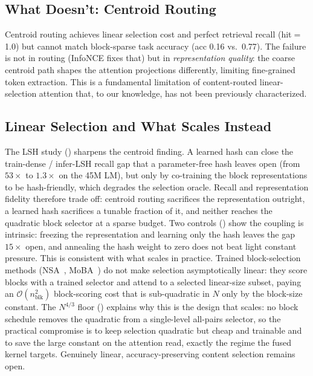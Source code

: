 \documentclass[10pt,letterpaper]{article}
\newcommand{\Ocomplex}{\mathcal{O}}
\begin{document}
\subsection{What Doesn't: Centroid Routing}

Centroid routing achieves linear selection cost and perfect retrieval recall
(hit$=$1.0) but cannot match block-sparse task accuracy (acc 0.16 vs.\ 0.77).
The failure is not in routing (InfoNCE \cite{oord2018infonce} fixes that) but
in \emph{representation quality}: the coarse centroid path shapes the
attention projections differently, limiting fine-grained token extraction.
This is a fundamental limitation of content-routed linear-selection attention
that, to our knowledge, has not been previously characterized.

\subsection{Linear Selection and What Scales Instead}

The LSH study () sharpens the centroid finding. A learned hash can
close the train-dense / infer-LSH recall gap that a parameter-free hash leaves
open (from $53\times$ to $1.3\times$ on the 45M LM), but only by co-training the
block representations to be hash-friendly, which degrades the selection oracle.
Recall and representation fidelity therefore trade off: centroid routing
sacrifices the representation outright, a learned hash sacrifices a tunable
fraction of it, and neither reaches the quadratic block selector at a sparse
budget. Two controls () show the coupling is intrinsic: freezing the
representation and learning only the hash leaves the gap $15\times$ open, and
annealing the hash weight to zero does not beat light constant pressure. This is
consistent with what scales in practice. Trained block-selection
methods (NSA~\cite{yuan2025nsa}, MoBA~\cite{lu2025moba}) do not make selection
asymptotically linear: they score blocks with a trained selector and attend to a
selected linear-size subset, paying an $\Ocomplex(n_{\text{blk}}^2)$ block-scoring
cost that is sub-quadratic in $N$ only by the block-size constant. The $N^{4/3}$
floor () explains why this is the design that scales: no block
schedule removes the quadratic from a single-level all-pairs selector, so the
practical compromise is to keep selection quadratic but cheap and trainable and to
save the large constant on the attention read, exactly the regime the fused kernel
targets. Genuinely linear, accuracy-preserving content selection remains open.
\end{document}
